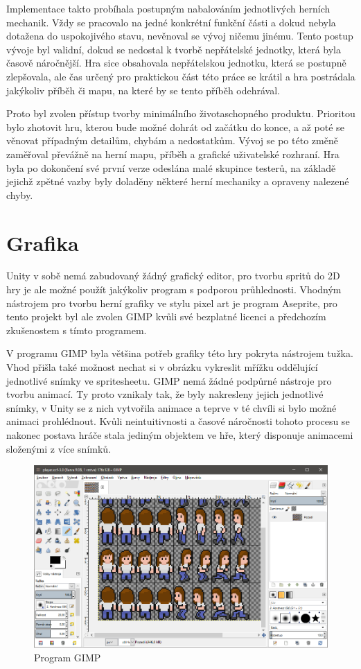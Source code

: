 \documentclass[FM,Proj]{tulthesis}
\begin{document}
	Implementace takto probíhala postupným nabalováním jednotlivých herních mechanik. Vždy se pracovalo na jedné konkrétní funkční části a dokud nebyla dotažena do uspokojivého stavu, nevěnoval se vývoj ničemu jinému. Tento postup vývoje byl validní, dokud se nedostal k tvorbě nepřátelské jednotky, která byla časově náročnější. Hra sice obsahovala nepřátelskou jednotku, která se postupně zlepšovala, ale čas určený pro praktickou část této práce se krátil a hra postrádala jakýkoliv příběh či mapu, na které by se tento příběh odehrával.
	
	Proto byl zvolen přístup tvorby minimálního životaschopného produktu. Prioritou bylo zhotovit hru, kterou bude možné dohrát od začátku do konce, a až poté se věnovat případným detailům, chybám a nedostatkům. Vývoj se po této změně zaměřoval převážně na herní mapu, příběh a grafické uživatelské rozhraní. Hra byla po dokončení své první verze odeslána malé skupince testerů, na základě jejichž zpětné vazby byly doladěny některé herní mechaniky a opraveny nalezené chyby.
	
	\section{Grafika} %
	
	Unity v sobě nemá zabudovaný žádný grafický editor, pro tvorbu spritů do 2D hry je ale možné použít jakýkoliv program s podporou průhlednosti. Vhodným nástrojem pro tvorbu herní grafiky ve stylu pixel art je program Aseprite, pro tento projekt byl ale zvolen GIMP kvůli své bezplatné licenci a předchozím zkušenostem s tímto programem.
	
	V programu GIMP byla většina potřeb grafiky této hry pokryta nástrojem tužka. Vhod přišla také možnost nechat si v obrázku vykreslit mřížku oddělující jednotlivé snímky ve spritesheetu. GIMP nemá žádné podpůrné nástroje pro tvorbu animací. Ty proto vznikaly tak, že byly nakresleny jejich jednotlivé snímky, v Unity se z nich vytvořila animace a teprve v té chvíli si bylo možné animaci prohlédnout. Kvůli neintuitivnosti a časové náročnosti tohoto procesu se nakonec postava hráče stala jediným objektem ve hře, který disponuje animacemi složenými z více snímků.
	
	\begin{figure}[ht]
		\centering
		\includegraphics[width=\textwidth]{img/GIMP}
		\caption{Program GIMP}		
	\end{figure}
	
\end{document}

